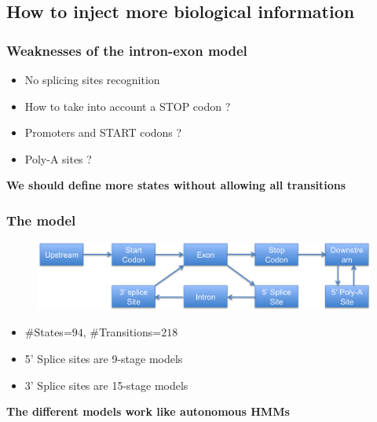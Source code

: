 \documentclass{beamer}[12pt]
\begin{document}
\subsection{How to inject more biological information}
\begin{frame}
\frametitle{Weaknesses of the intron-exon model}
	\begin{itemize}
		\item No splicing sites recognition 
		\item How to take into account a STOP codon ? 
		\item Promoters and START codons ? 
		\item Poly-A sites ?
	\end{itemize}
	
	\vspace{0.5cm}
	
	\pause\begin{center}
		\textbf{We should define more states without allowing all transitions}
	\end{center}
	
\end{frame}

\begin{frame}
\frametitle{The model}
	\begin{figure}
	\includegraphics[width=1.0\textwidth]{../picturesforthepresentation/combinedHMM.png}
	\end{figure}
	
	\begin{itemize}
		\item $\#$States=$94$, $\#$Transitions=$218$
		\item 5' Splice sites are 9-stage models
		\item 3' Splice sites are 15-stage models
	\end{itemize}
	
	\pause\begin{center}
		\textbf{The different models work like autonomous HMMs}
	\end{center}
	
\end{frame}
\end{document}
